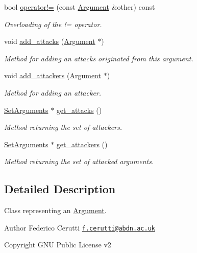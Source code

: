 \begin{DoxyCompactItemize}
bool \hyperlink{classArgument_a6f035645e46115d0f5a3f3ca98461bce}{operator!=} (const \hyperlink{classArgument}{Argument} \&other) const 
\begin{DoxyCompactList}\small\item\em Overloading of the != operator. \end{DoxyCompactList}\item 
void \hyperlink{classArgument_a8a5cddf583929099b8228ed9300e2759}{add\-\_\-attacks} (\hyperlink{classArgument}{Argument} $\ast$)
\begin{DoxyCompactList}\small\item\em Method for adding an attacks originated from this argument. \end{DoxyCompactList}\item 
void \hyperlink{classArgument_ad295236fa6d55121e37e90ec05289c8c}{add\-\_\-attackers} (\hyperlink{classArgument}{Argument} $\ast$)
\begin{DoxyCompactList}\small\item\em Method for adding an attacker. \end{DoxyCompactList}\item 
\hyperlink{classSetArguments}{Set\-Arguments} $\ast$ \hyperlink{classArgument_ae8c77c2d0676845f250d77dfb3ce4378}{get\-\_\-attacks} ()
\begin{DoxyCompactList}\small\item\em Method returning the set of attackers. \end{DoxyCompactList}\item 
\hyperlink{classSetArguments}{Set\-Arguments} $\ast$ \hyperlink{classArgument_aa57914a9e5a27af3c3dbd1db8c0d3602}{get\-\_\-attackers} ()
\begin{DoxyCompactList}\small\item\em Method returning the set of attacked arguments. \end{DoxyCompactList}\end{DoxyCompactItemize}


\subsection{Detailed Description}
Class representing an \hyperlink{classArgument}{Argument}. 

\begin{DoxyAuthor}{Author}
Federico Cerutti \href{mailto:f.cerutti@abdn.ac.uk}{\tt f.\-cerutti@abdn.\-ac.\-uk} 
\end{DoxyAuthor}
\begin{DoxyCopyright}{Copyright}
G\-N\-U Public License v2 
\end{DoxyCopyright}


